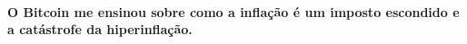 \paragraph{O Bitcoin me ensinou sobre como a inflação é um imposto escondido e a catástrofe da hiperinflação.}

%
%
%
%
%
